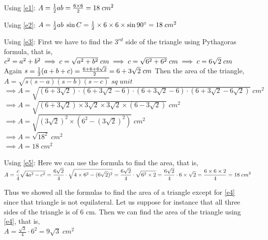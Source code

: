 Using \autoref{e1}: $A=\frac{1}{2}ab=\frac{6\times6}{2}=18\;cm^2\\$


Using \autoref{e2}: $A=\frac{1}{2}ab\;\sin C=\frac{1}{2}\times6\times6\times \sin 90\degree=18\;cm^2$


Using \autoref{e3}: 
First we have to find the $3^{rd}$ side of the triangle using Pythagoras formula, that is,\\
$c^2=a^2+b^2\\
\implies c=\sqrt{a^2+b^2}\;cm\\
\implies c=\sqrt{6^2+6^2}\;cm\\
\implies c=6\sqrt{2}\;cm$\\[1ex]
Again $s=\frac{1}{2}(a+b+c)=\frac{6+6+6\sqrt{2}}{2}=6+3\sqrt{2}\;cm\\$
Then the area of the triangle,\\$A=\displaystyle \sqrt{s(s-a)(s-b)(s-c)}\; sq\;unit$
\\$\implies A=\displaystyle \sqrt{(6+3\sqrt{2})\cdot(6+3\sqrt{2}-6)\cdot(6+3\sqrt{2}-6)\cdot(6+3\sqrt{2}-6\sqrt{2})}\;cm^2$
\\$\implies A=\displaystyle \sqrt{(6+3\sqrt{2})\times 3\sqrt{2}\times 3\sqrt{2}\times (6-3\sqrt{2})}\;cm^2$
\\$\implies A=\displaystyle \sqrt{(3\sqrt{2})^2\times (6^2-(3\sqrt{2})^2)}\;cm^2$
\\$\implies A=\displaystyle \sqrt{18^2}\;cm^2$
\\$\implies A=\displaystyle 18 \;cm^2$


Using \autoref{e5}:
Here we can use the formula to find the area, that is,\\

$\displaystyle A=\frac{c}{4}\sqrt{4a^2-c^2}
\\=\frac{6\sqrt{2}}{4}\cdot \sqrt{4\times 6^2-(6\sqrt{2})^2}
\\=\frac{6\sqrt{2}}{4}\cdot \sqrt{6^2\times2}
\\=\frac{6\sqrt{2}}{4}\cdot 6\times\sqrt{2}
\\=\frac{6\times6\times2}{4}
\\=18\;cm^2$


Thus we showed all the formulas to find the area of a triangle except for \autoref{e4} since that triangle is not equilateral. Let us suppose for instance that all three sides of the triangle is of 6 cm. Then we can find the area of the triangle using \autoref{e4}, that is,\\

$\displaystyle A=\frac{\sqrt{3}}{4}\cdot 6^2=9\sqrt{3}\;cm^2$


